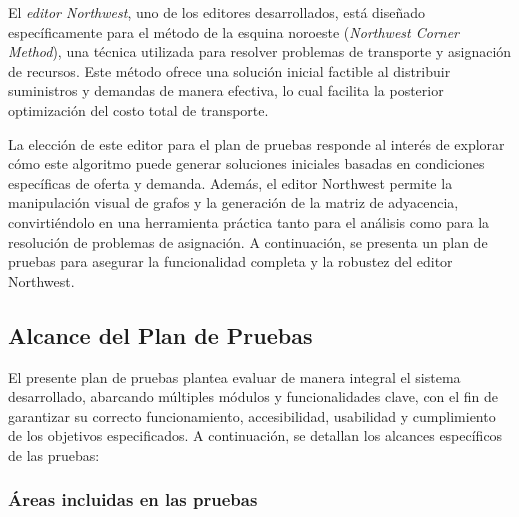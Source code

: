 \documentclass[stu, 12pt, letterpaper, donotrepeattitle, floatsintext, natbib]{apa7}
\begin{document}
\noindent El \textit{editor Northwest}, uno de los editores desarrollados, está diseñado específicamente para el método de la esquina noroeste (\textit{Northwest Corner Method}), una técnica utilizada para resolver problemas de transporte y asignación de recursos. Este método ofrece una solución inicial factible al distribuir suministros y demandas de manera efectiva, lo cual facilita la posterior optimización del costo total de transporte.

\noindent La elección de este editor para el plan de pruebas responde al interés de explorar cómo este algoritmo puede generar soluciones iniciales basadas en condiciones específicas de oferta y demanda. Además, el editor Northwest permite la manipulación visual de grafos y la generación de la matriz de adyacencia, convirtiéndolo en una herramienta práctica tanto para el análisis como para la resolución de problemas de asignación. A continuación, se presenta un plan de pruebas para asegurar la funcionalidad completa y la robustez del editor Northwest.

\subsection{Alcance del Plan de Pruebas}

El presente plan de pruebas plantea evaluar de manera integral el sistema desarrollado, abarcando múltiples módulos y funcionalidades clave, con el fin de garantizar su correcto funcionamiento, accesibilidad, usabilidad y cumplimiento de los objetivos especificados. A continuación, se detallan los alcances específicos de las pruebas:

\subsubsection{Áreas incluidas en las pruebas}
\end{document}
